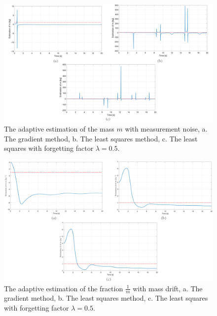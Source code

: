 \documentclass[12pt]{article}
\begin{document}
\begin{figure}[!h]
	\includegraphics[width=1\columnwidth]{figures/measurementNoise_m.png}
	\centering
	\caption{The adaptive estimation of the mass $m$ with measurement noise, a. The gradient method, b. The least squares method, c. The least squares with forgetting factor $\lambda=0.5$.}
	\label{fig_noiseMeasurement_m}
\end{figure}
 
\begin{figure}[!h]
	\includegraphics[width=.95\columnwidth]{figures/driftMass.png}
	\centering
	\caption{The adaptive estimation of the fraction $\frac{1}{m}$ with mass drift, a. The gradient method, b. The least squares method, c. The least squares with forgetting factor $\lambda=0.5$.}
	\label{fig_noiseDrift}
\end{figure}
\end{document}

